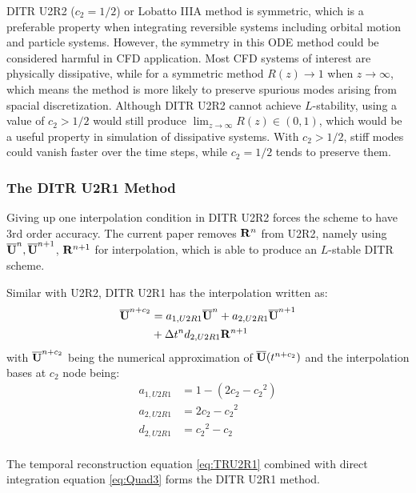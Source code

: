 \documentclass[preprint,12pt]{elsarticle}
\begin{document}
DITR U2R2 ($c_2=1/2$) or Lobatto IIIA method is symmetric,
which is a preferable property when integrating
reversible systems including orbital motion and particle
systems.
However,
the symmetry in this ODE method could be considered harmful in CFD application.
Most CFD systems of interest are physically dissipative,
while for a symmetric method
$R(z) \rightarrow 1$ when $z \rightarrow \infty$,
which means the method is more likely to preserve
spurious modes arising from spacial discretization.
Although DITR U2R2 cannot achieve $L$-stability,
using a value of $c_2 > 1/2$ would still
produce $\lim_{z\rightarrow\infty}R(z)\in(0,1)$, which
would be a useful property in simulation of dissipative systems.
With  $c_2 > 1/2$, stiff modes could vanish faster over the time
steps, while $c_2 = 1/2$ tends to preserve them.

\subsubsection{The DITR U2R1 Method}

Giving up one interpolation condition in DITR U2R2
forces the scheme to have 3rd order accuracy.
The current paper removes $\mathbf{R}^{n}$ from U2R2, namely
using $\overline{\mathbf{U}}^{n},\overline{\mathbf{U}}^{n+1}$, $\mathbf{R}^{n+1}$ for interpolation,
which is able to produce an $L$-stable DITR scheme.

Similar with U2R2, DITR U2R1 has the interpolation
written as:
\begin{equation}
    \begin{aligned}
        \label{eq:TRU2R1}
        \overline{\mathbf{U}}^{n+c_2} & =
        a_{1,U2R1}\overline{\mathbf{U}}^{n} +
        a_{2,U2R1}\overline{\mathbf{U}}^{n + 1}
        \\ & +
        \mathrm\Delta t^n d_{2,U2R1}\mathbf{R}^{n + 1}
    \end{aligned}
\end{equation}
with $\overline{\mathbf{U}}^{n+c_2}$ being
the numerical approximation
of $\overline{\mathbf{U}}(t^{n+c_2})$
and the interpolation bases at $c_2$ node being:
\begin{equation}
    \begin{aligned}
        a_{1,U2R1} & = 1 - (2c_2 - {c_2}^2) \\
        a_{2,U2R1} & = 2c_2 - {c_2}^2       \\
        d_{2,U2R1} & = {c_2}^2 - {c_2}      \\
    \end{aligned}
    \label{eq:interpU2R1}
\end{equation}

The temporal reconstruction equation \eqref{eq:TRU2R1}
combined with direct integration equation \eqref{eq:Quad3}
forms the DITR U2R1 method.
\end{document}
